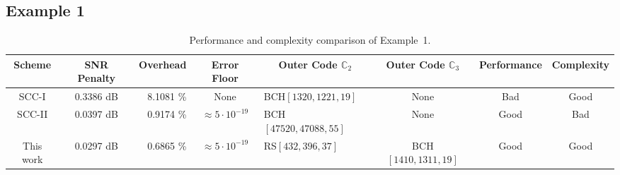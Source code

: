 \documentclass[conference]{IEEEtran}
\newcommand{\C}{\mathbb{C}}  %
\begin{document}
\subsection{Example 1} \label{sec:numerical_results}

\begin{table}[t]
\caption{\label{tab:examples} Performance and complexity comparison of Example~1.}
  \begin{center}
    \begin{tabular}{|c|c|r|c|l|c|c|c|} %
      \multicolumn{1}{c}{Scheme}& 
      \multicolumn{1}{c}{SNR Penalty}&
      \multicolumn{1}{c}{Overhead}&
      \multicolumn{1}{c}{Error Floor}&
      \multicolumn{1}{c}{Outer Code $\C_2$}&
      \multicolumn{1}{c}{Outer Code $\C_3$}& 
      \multicolumn{1}{c}{Performance}&
      \multicolumn{1}{c}{Complexity}\\ 
      \hline 
      SCC-I       & 0.3386 dB   &  8.1081 \%       & None                      & BCH$[1320,1221,19]$    & None                    & Bad   & Good   \\
      \hline 
      SCC-II       & 0.0397 dB   &  0.9174 \%       & $\approx 5\cdot 10^{-19}$  & BCH$[47520,47088,55]$  & None     
      & Good  & Bad    \\
      \hline 
      This work         & 0.0297 dB   &  0.6865 \%       & $\approx 5\cdot 10^{-19}$  & RS$[432,396,37]$       & BCH$[1410,1311,19]$  & Good  & Good   \\
      \hline 
    \end{tabular}
    \vspace{-5mm}
  \end{center}
\end{table}
\end{document}
